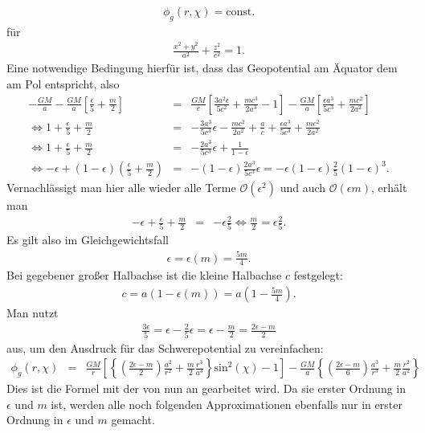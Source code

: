 \documentclass{book}
\renewcommand{\sin}{\text{sin}}
\begin{document}
%
\begin{eqnarray}
\phi_g\left(r, \chi\right) = \text{const}.
\end{eqnarray}
%
für
%
\begin{eqnarray}
\frac{x^2 + y^2}{a^2} + \frac{z^2}{c^2} = 1.\label{eq:allg_ellipse}
\end{eqnarray}
%
Eine notwendige Bedingung hierfür ist, dass das Geopotential am Äquator dem am Pol entspricht, also
%
\begin{eqnarray}
- \frac{GM}{a} - \frac{GM}{a}\left[\frac{\epsilon}{5} + \frac{m}{2}\right] & = & \frac{GM}{c}\left[\frac{3a^2\epsilon}{5c^2} + \frac{mc^3}{2a^3} - 1\right] - \frac{GM}{a}\left[\frac{\epsilon a^3}{5c^3} + \frac{mc^2}{2a^2}\right]\nonumber\\
\Leftrightarrow 1 + \frac{\epsilon}{5} + \frac{m}{2} & = & -\frac{3a^3}{5c^3}\epsilon - \frac{mc^2}{2a^2} + \frac{a}{c} + \frac{\epsilon a^3}{5c^3} + \frac{mc^2}{2a^2}\nonumber\\
\Leftrightarrow 1 + \frac{\epsilon}{5} + \frac{m}{2} & = & -\frac{2a^3}{5c^3}\epsilon + \frac{1}{1 - \epsilon}\nonumber\\
\Leftrightarrow - \epsilon + \left(1 - \epsilon\right)\left(\frac{\epsilon}{5} + \frac{m}{2}\right) & = & -\left(1 - \epsilon\right)\frac{2a^3}{5c^3}\epsilon = -\epsilon\left(1 - \epsilon\right)\frac{2}{5}\left(1 - \epsilon\right)^3.
\end{eqnarray}
%
Vernachlässigt man hier alle wieder alle Terme $\mathcal{O}\left(\epsilon^2\right)$ und auch $\mathcal{O}\left(\epsilon m\right)$, erhält man
%
\begin{eqnarray}
- \epsilon + \frac{\epsilon}{5} + \frac{m}{2} & = & -\epsilon\frac{2}{5}\Leftrightarrow \frac{m}{2} = \epsilon\frac{2}{5}.
\end{eqnarray}
%
Es gilt also im Gleichgewichtsfall
%
\begin{eqnarray}
\epsilon = \epsilon\left(m\right) = \frac{5m}{4}.
\end{eqnarray}
%
Bei gegebener großer Halbachse ist die kleine Halbachse $c$ festgelegt:
%
\begin{eqnarray}
c = a\left(1 - \epsilon\left(m\right)\right) = a\left(1 - \frac{5m}{4}\right).
\end{eqnarray}
%
Man nutzt 
%
\begin{eqnarray}
\frac{3\epsilon}{5} = \epsilon - \frac{2}{5}\epsilon = \epsilon - \frac{m}{2} = \frac{2\epsilon - m}{2}
\end{eqnarray}
%
aus, um den Ausdruck für das Schwerepotential zu vereinfachen:
%
\begin{eqnarray}
\phi_g\left(r, \chi\right) & = & \frac{GM}{r}\left[\left\lbrace\left(\frac{2\epsilon - m}{2}\right)\frac{a^2}{r^2} + \frac{m}{2}\frac{r^3}{a^3}\right\rbrace\sin^2\left(\chi\right) - 1\right] - \frac{GM}{a}\left\lbrace\left(\frac{2\epsilon - m}{6}\right)\frac{a^3}{r^3} + \frac{m}{2}\frac{r^2}{a^2}\right\rbrace\label{eq:schwerepotential}
\end{eqnarray}
%
Dies ist die Formel mit der von nun an gearbeitet wird. Da sie erster Ordnung in $\epsilon$ und $m$ ist, werden alle noch folgenden Approximationen ebenfalls nur in erster Ordnung in $\epsilon$ und $m$ gemacht.
\end{document}
